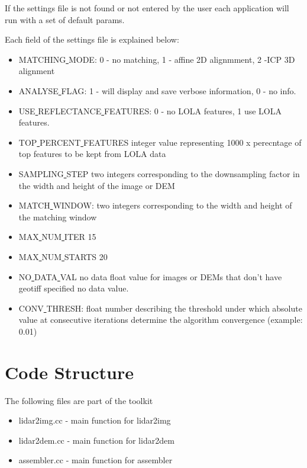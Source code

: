 \documentclass[12pt]{article}
\begin{document}
If the settings file is not found or not entered by the user each application will run with a set of default params.

Each field of the settings file is explained below:
\begin{itemize}
\item{MATCHING\underline{ }MODE}: 0 - no matching, 1 - affine 2D alignmment, 2 -ICP 3D alignment\\
\item{ANALYSE\underline{ }FLAG}:  1 - will display and save verbose information, 0 - no info.\\
\item{USE\underline{ }REFLECTANCE\underline{ }FEATURES}: 0 - no LOLA features, 1 use LOLA features.\\ 
\item{TOP\underline{ }PERCENT\underline{ }FEATURES} integer value representing 1000 x perecntage of top features to be kept from LOLA data\\
\item{SAMPLING\underline{ }STEP} two integers corresponding to the downsampling factor in the width and height of the image or DEM\\
\item{MATCH\underline{ }WINDOW}: two integers corresponding to the width and height of the matching window\\
\item{MAX\underline{ }NUM\underline{ }ITER} 15\\
\item{MAX\underline{ }NUM\underline{ }STARTS} 20\\
\item{NO\underline{ }DATA\underline{ }VAL} no data float value for images or DEMs that don't have geotiff specified no data value.\\
\item{CONV\underline{ }THRESH}: float number describing the threshold under which absolute value at consecutive iterations determine 
                                the algorithm convergence (example: 0.01)\\
\end{itemize}


\section{Code Structure}
The following files are part of the toolkit
\begin{itemize}
\item{lidar2img.cc} - main function for lidar2img
\item{lidar2dem.cc} - main function for lidar2dem 
\item{assembler.cc} - main function for assembler
\end{itemize}
\end{document}
